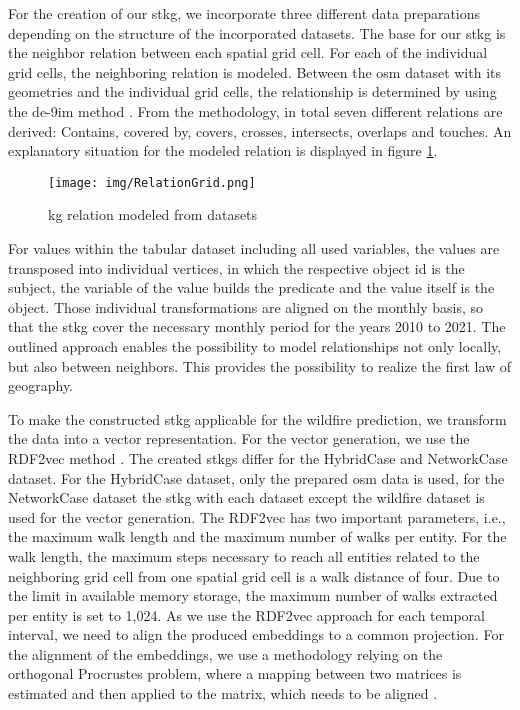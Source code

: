 \documentclass[
]{ceurart}
\begin{document}
For the creation of our \gls*{stkg}, we incorporate three different data preparations depending on the structure of the incorporated datasets. The base for our \gls*{stkg} is the neighbor relation between each spatial grid cell. For each of the individual grid cells, the neighboring relation is modeled. Between the \gls*{osm} dataset with its geometries and the individual grid cells, the relationship is determined by using the \gls*{de-9im} method \cite{Clementini.1993}. From the methodology, in total seven different relations are derived: Contains, covered by, covers, crosses, intersects, overlaps and touches. An explanatory situation for the modeled relation is displayed in figure \ref{fig:RelationKG}.

\begin{figure}[ht]
	\centering
	\texttt{[image: img/RelationGrid.png]}
	\caption{\gls*{kg} relation modeled from datasets}
	\label{fig:RelationKG}
\end{figure}

For values within the tabular dataset including all used variables, the values are transposed into individual vertices, in which the respective object \gls*{id} is the subject, the variable of the value builds the predicate and the value itself is the object. Those individual transformations are aligned on the monthly basis, so that the \gls*{stkg} cover the necessary monthly period for the years 2010 to 2021. The outlined approach enables the possibility to model relationships not only locally, but also between neighbors. This provides the possibility to realize the first law of geography.

To make the constructed \gls*{stkg} applicable for the wildfire prediction, we transform the data into a vector representation. For the vector generation, we use the RDF2vec method \cite{Ristoski.2016}. The created \glspl*{stkg} differ for the HybridCase and NetworkCase dataset. For the HybridCase dataset, only the prepared \gls*{osm} data is used, for the NetworkCase dataset the \gls*{stkg} with each dataset except the wildfire dataset is used for the vector generation. The RDF2vec has two important parameters, i.e., the maximum walk length and the maximum number of walks per entity. For the walk length, the maximum steps necessary to reach all entities related to the neighboring grid cell from one spatial grid cell is a walk distance of four. Due to the limit in available memory storage, the maximum number of walks extracted per entity is set to 1,024. As we use the RDF2vec approach for each temporal interval, we need to align the produced embeddings to a common projection. For the alignment of the embeddings, we use a methodology relying on the orthogonal Procrustes problem, where a mapping between two matrices is estimated and then applied to the matrix, which needs to be aligned \cite{Hamilton.2016}.
\end{document}
